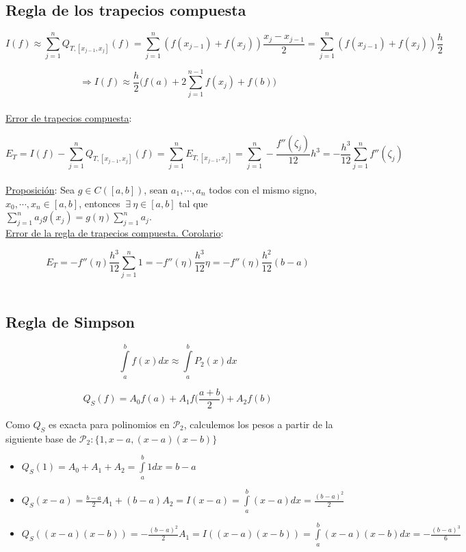 \subsection{Regla de los trapecios compuesta}

$$I(f) \approx \sum \limits_{j = 1}^{n} Q_{T, [x_{j - 1}, x_{j}]}(f) = \sum \limits_{j = 1}^{n} (f(x_{j - 1}) + f(x_{j}))\frac{x_{j} - x_{j - 1}}{2} = \sum \limits_{j = 1}^{n} (f(x_{j - 1}) + f(x_{j}))\frac{h}{2}$$

$$\Rightarrow I(f) \approx \frac{h}{2}\bigg(f(a) + 2 \sum \limits_{j = 1}^{n - 1} f(x_{j}) + f(b)\bigg)$$\\

\underline{Error de trapecios compuesta}:

$$E_{T} = I(f) - \sum \limits_{j = 1}^{n} Q_{T, [x_{j - 1}, x_{j}]}(f) = \sum \limits_{j = 1}^{n} E_{T, [x_{j - 1}, x_{j}]} = \sum \limits_{j = 1}^{n} -\frac{f''(\zeta_{j})}{12}h^{3} = -\frac{h^{3}}{12}\sum \limits_{j = 1}^{n} f''(\zeta_{j})$$\\

\underline{Proposici\'on}: Sea $g \in C([a, b])$, sean $a_{1}, \cdots, a_{n}$ todos con el mismo signo, $x_{0}, \cdots, x_{n} \in [a, b]$, entonces $\ \exists \ \eta \in [a, b]$ tal que $\sum \limits_{j = 1}^{n} a_{j}g(x_{j}) = g(\eta)\sum \limits_{j = 1}^{n} a_{j}$.\\

\underline{Error de la regla de trapecios compuesta. Corolario}:

$$E_{T} = -f''(\eta)\frac{h^{3}}{12}\sum \limits_{j = 1}^{n} 1 = -f''(\eta)\frac{h^{3}}{12}\eta = -f''(\eta)\frac{h^{2}}{12}(b - a)$$\\

\subsection{Regla de Simpson}

$$\int \limits_{a}^{b} f(x)dx \approx \int \limits_{a}^{b} P_{2}(x)dx$$

$$Q_{S}(f) = A_{0}f(a) + A_{1}f\bigg(\frac{a + b}{2}\bigg) + A_{2}f(b)$$

Como $Q_{S}$ es exacta para polinomios en $\mathcal{P}_{2}$, calculemos los pesos a partir de la siguiente base de $\mathcal{P}_{2}: \{1, x - a, (x - a)(x - b)\}$

\begin{itemize}
	\item $Q_{S}(1) = A_{0} + A_{1} + A_{2} = \int \limits_{a}^{b} 1 dx = b - a$
	
	\item $Q_{S}(x - a) = \frac{b - a}{2}A_{1} + (b - a)A_{2} = I(x - a) = \int \limits_{a}^{b} (x - a) dx = \frac{(b - a)^{2}}{2}$
	
	\item $Q_{S}((x - a)(x - b)) = -\frac{(b - a)^{2}}{2}A_{1} = I((x - a)(x - b)) = \int \limits_{a}^{b} (x - a)(x - b) dx = -\frac{(b - a)^{3}}{6}$
\end{itemize}

